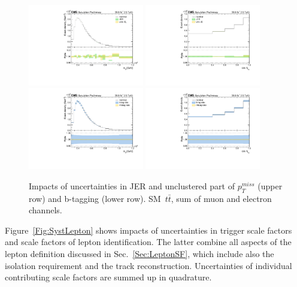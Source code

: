 \begin{figure}
  \centering
  \includegraphics[width=0.45\textwidth]{fig/chapt7/syst/impacts/MassTT/jetMETNoJEC.pdf}
  \includegraphics[width=0.45\textwidth]{fig/chapt7/syst/impacts/CosTopLepTT/jetMETNoJEC.pdf} \\
  \includegraphics[width=0.45\textwidth]{fig/chapt7/syst/impacts/MassTT/bTag.pdf}
  \includegraphics[width=0.45\textwidth]{fig/chapt7/syst/impacts/CosTopLepTT/bTag.pdf}
  \caption{Impacts of uncertainties in JER and unclustered part of $p_{T}^{miss}$ (upper row) and b-tagging (lower row). SM~$t\bar t$, sum of muon and electron channels.}
  \label{Fig:SystBTagJME}
\end{figure}

Figure~\ref{Fig:SystLepton} shows impacts of uncertainties in trigger scale factors and scale factors of lepton identification.
The latter combine all aspects of the lepton definition discussed in Sec.~\ref{Sec:LeptonSF}, which include also the isolation requirement and the track reconstruction.
Uncertainties of individual contributing scale factors are summed up in quadrature.

